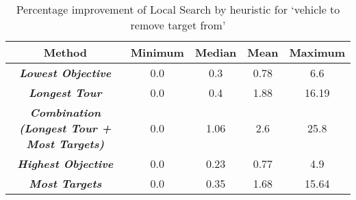 \begin{table}[htb!]
	\centering
	\begin{tabular}{|c|c|c|c|c|}
	\hline
	\textbf{Method} & \textbf{Minimum} & \textbf{Median} & \textbf{Mean} & \textbf{Maximum} \\\hline
	\textit\textbf{{Lowest Objective}} & 0.0 & 0.3 & 0.78 & 6.6\\\hline
	\textit\textbf{{Longest Tour}} & 0.0 & 0.4 & 1.88 & 16.19\\\hline
	\textit\textbf{{Combination (Longest Tour + Most Targets)}} & 0.0 & 1.06 & 2.6 & 25.8\\\hline
	\textit\textbf{{Highest Objective}} & 0.0 & 0.23 & 0.77 & 4.9\\\hline
	\textit\textbf{{Most Targets}} & 0.0 & 0.35 & 1.68 & 15.64\\\hline
	\end{tabular}
\caption{Percentage improvement of Local Search by heuristic for \lq vehicle to remove target from\rq}
\label{tab:percentage_improvement}
\end{table}